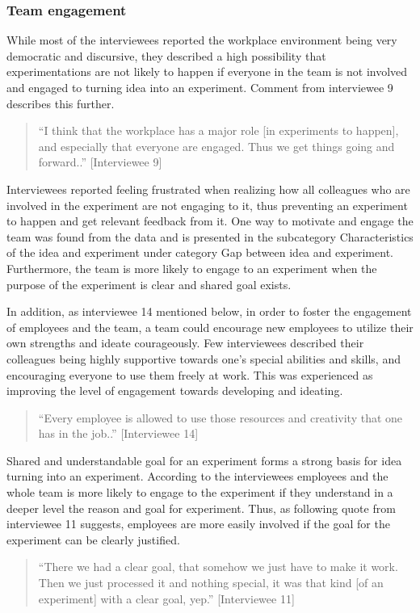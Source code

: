 \subsubsection{Team engagement}
While most of the interviewees reported the workplace environment being very democratic and discursive, they described a high possibility that experimentations are not likely to happen if everyone in the team is not involved and engaged to turning idea into an experiment. Comment from interviewee 9 describes this further.
\begin{quote}
 ``I think that the workplace has a major role [in experiments to happen], and especially that everyone are engaged. Thus we get things going and forward..'' [Interviewee 9]
\end{quote}
Interviewees reported feeling frustrated when realizing how all colleagues who are involved in the experiment are not engaging to it, thus preventing an experiment to happen and get relevant feedback from it. One way to motivate and engage the team was found from the data and is presented in the subcategory Characteristics of the idea and experiment under category Gap between idea and experiment. Furthermore, the team is more likely to engage to an experiment when the purpose of the experiment is clear and shared goal exists.  

In addition, as interviewee 14 mentioned below, in order to foster the engagement of employees and the team, a team could encourage new employees to utilize their own strengths and ideate courageously. Few interviewees described their colleagues being highly supportive towards one's special abilities and skills, and encouraging everyone to use them freely at work. This was experienced as improving the level of engagement towards developing and ideating.
\begin{quote}
``Every employee is allowed to use those resources and creativity that one has in the job..'' [Interviewee 14]
\end{quote}
Shared and understandable goal for an experiment forms a strong basis for idea turning into an experiment. According to the interviewees employees and the whole team is more likely to engage to the experiment if they understand in a deeper level the reason and goal for experiment. Thus, as following quote from interviewee 11 suggests, employees are more easily involved if the goal for the experiment can be clearly justified. 
\begin{quote}
``There we had a clear goal, that somehow we just have to make it work. Then we just processed it and nothing special, it was that kind [of an experiment] with a clear goal, yep.'' [Interviewee 11]
\end{quote}

